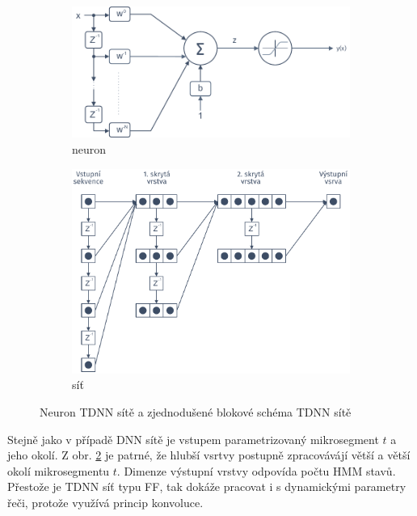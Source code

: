 \begin{figure}[htpb]
  \centering
  \begin{subfigure}[b]{0.45\textwidth}
    \includegraphics[width=\textwidth]{./ch4-asr/img/neuron-tdnn.pdf}
    \caption{neuron}
    \label{fig:asr:acoustic:dnn:tdnn:neuron}
  \end{subfigure}
  \begin{subfigure}[b]{0.35\textwidth}
    \includegraphics[width=\textwidth]{./ch4-asr/img/tdnn.pdf}
    \caption{síť}
    \label{fig:asr:acoustic:dnn:tdnn:net}
  \end{subfigure}
  \caption{Neuron TDNN sítě a zjednodušené blokové schéma TDNN sítě \cite{Craig2000}}
  \label{fig:asr:acoustic:dnn:tdnn}
\end{figure}

Stejně jako v případě DNN sítě je vstupem parametrizovaný mikrosegment $t$ a jeho okolí. Z obr. \ref{fig:asr:acoustic:dnn:tdnn:net} je patrné, že hlubší vsrtvy postupně zpracovávájí větší a větší okolí mikrosegmentu $t$. Dimenze výstupní vrstvy odpovída počtu HMM stavů. Přestože je TDNN síť typu FF, tak dokáže pracovat i s dynamickými parametry řeči, protože využívá princip konvoluce.
